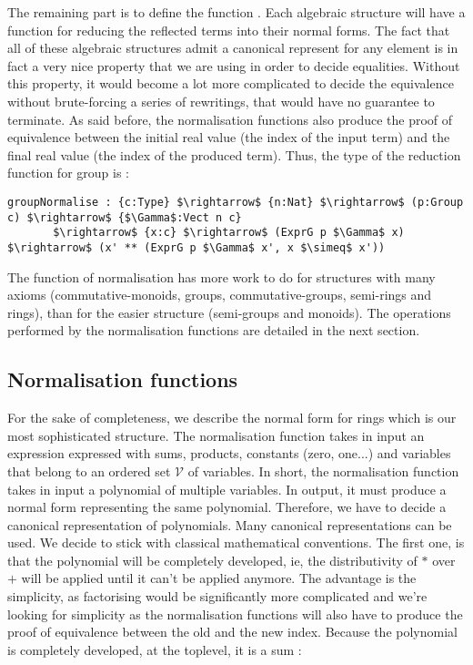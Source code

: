 The remaining part is to define the function . Each algebraic structure will have a function for reducing the reflected terms into their normal forms. The fact that all of these algebraic structures admit a canonical represent for any element is in fact a very nice property that we are using in order to decide equalities. Without this property, it would become a lot more complicated to decide the equivalence without brute-forcing a series of rewritings, that would have no guarantee to terminate.
As said before, the normalisation functions also produce the proof of equivalence between the initial real value (the index of the input term) and the final real value (the index of the produced term). Thus, the type of the reduction function for group is :


\begin{lstlisting}
groupNormalise : {c:Type} $\rightarrow$ {n:Nat} $\rightarrow$ (p:Group c) $\rightarrow$ {$\Gamma$:Vect n c} 
       $\rightarrow$ {x:c} $\rightarrow$ (ExprG p $\Gamma$ x) $\rightarrow$ (x' ** (ExprG p $\Gamma$ x', x $\simeq$ x'))
\end{lstlisting}


The function of normalisation has more work to do for structures with many axioms (commutative-monoids, groups, commutative-groups, semi-rings and rings), than for the easier structure (semi-groups and monoids).
The operations performed by the normalisation functions are detailed in the next section.


\subsection{Normalisation functions}
\label{sect:normalFormShape}

For the sake of completeness, we describe the normal form for rings which is our most sophisticated structure.
The normalisation function takes in input an expression expressed with sums, products, constants (zero, one...) and variables that belong to an ordered set $\mathcal{V}$ of variables. In short, the normalisation function takes in input a polynomial of multiple variables. In output, it must produce a normal form representing the same polynomial. Therefore, we have to decide a canonical representation of polynomials. Many canonical representations can be used. We decide to stick with classical mathematical conventions. The first one, is that the polynomial will be completely developed, ie, the distributivity of $*$ over $+$ will be applied until it can't be applied anymore. The advantage is the simplicity, as factorising would be significantly more complicated and we're looking for simplicity as the normalisation functions will also have to produce the proof of equivalence between the old and the new index. Because the polynomial is completely developed, at the toplevel, it is a sum :

